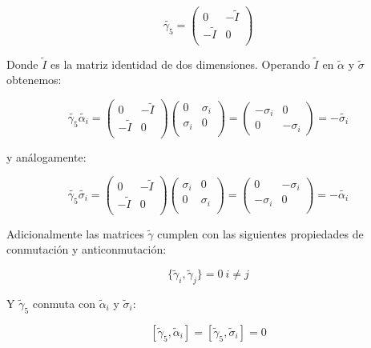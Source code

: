 \documentclass[a4paper, 12pt]{article} %
\begin{document}
\[
\widetilde{\gamma_5} = 
\begin{pmatrix} 
0 & - \widetilde{I} \\
-\widetilde{I} & 0 \\
\end{pmatrix}
\]

Donde $\widetilde{I}$ es la matriz identidad de dos dimensiones. Operando  $\widetilde{I}$ 
en $\widetilde{\alpha}$ y $\widetilde{\sigma}$ obtenemos:

\[
\widetilde{\gamma_5}\widetilde{\alpha_i} = 
\begin{pmatrix} 
0 & - \widetilde{I} \\
-\widetilde{I} & 0 \\
\end{pmatrix} 
\begin{pmatrix} 
0 & \sigma_i \\
\sigma_i & 0 \\
\end{pmatrix} 
= 
\begin{pmatrix}
-\sigma_i & 0 \\
0 & -\sigma_i
\end{pmatrix}
= -\widetilde{\sigma_i}
\]

y an\'alogamente:

\[
\widetilde{\gamma_5}\widetilde{\sigma_i} = 
\begin{pmatrix} 
0 & - \widetilde{I} \\
-\widetilde{I} & 0 \\
\end{pmatrix} 
\begin{pmatrix} 
\sigma_i & 0 \\
0 & \sigma_i  \\
\end{pmatrix} 
= 
\begin{pmatrix}
0 & -\sigma_i \\
-\sigma_i & 0 \\
\end{pmatrix}
= -\widetilde{\alpha_i}
\]

Adicionalmente las matrices $\widetilde{\gamma}$ cumplen con las siguientes
propiedades de conmutaci\'on y anticonmutaci\'on:

\[
\{ \widetilde{\gamma}_i, \widetilde{\gamma}_j \} = 0 \ i \neq j
\]

Y $\widetilde{\gamma}_5$ conmuta con $\widetilde{\alpha}_i$ y $\widetilde{\sigma}_i$: 

\[
[\widetilde{\gamma}_5, \widetilde{\alpha}_i] = [\widetilde{\gamma}_5,\widetilde{\sigma}_i] = 0
\]
\end{document}
